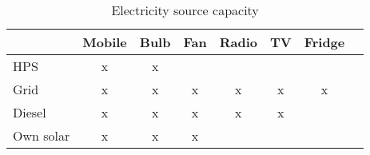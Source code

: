 \begin{table}[htbp]\centering
\caption{Electricity source capacity}
\begin{tabular}{l*{7}{c}}
\toprule
                &     Mobile&      Bulb&     Fan & Radio & TV  & Fridge\\
\midrule
HPS             &  x &   x &   & & & \\

Grid            &   x&    x&    x & x & x & x\\

Diesel          &    x &   x &   x & x & x  &\\

Own solar       &   x &   x &    x & & & \\
      
\bottomrule
\end{tabular}
\end{table}
